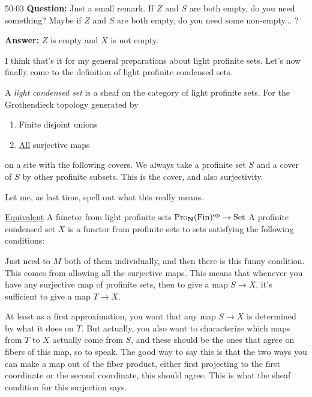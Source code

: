 \begin{unfinished}{50:03}
\textbf{Question:} Just a small remark. If $Z$ and $S$ are both empty, do you need something? Maybe if $Z$ and $S$ are both empty, do you need some non-empty... ? 

\textbf{Answer:} $Z$ is empty and $X$ is not empty. 

I think that's it for my general preparations about light profinite sets. Let's now finally come to the definition of light profinite condensed sets.

\begin{definition}

A \emph{light condensed set} is a sheaf on the category of light profinite sets. For the Grothendieck topology generated by 

\begin{enumerate}
\item Finite disjoint unions
\item \underline{All} surjective maps
\end{enumerate} 

\end{definition}

on a site with the following covers. We always take a profinite set $S$ and a cover of $S$ by other profinite subsets. This is the cover, and also surjectivity.

Let me, as last time, spell out what this really means.

\underline{Equivalent} A functor from light profinite sets $\operatorname{Pro}_{\mathbf N}(\operatorname{Fin})^{\mathrm{op}} \to \mathrm{Set}$
A profinite condensed set $X$ is a functor from profinite sets to sets satisfying the following conditions:

Just need to $M$ both of them individually, and then there is this funny condition. This comes from allowing all the surjective maps. This means that whenever you have any surjective map of profinite sets, then to give a map $S \to X$, it's sufficient to give a map $T \to X$. 

At least as a first approximation, you want that any map $S \to X$ is determined by what it does on $T$. But actually, you also want to characterize which maps from $T$ to $X$ actually come from $S$, and these should be the ones that agree on fibers of this map, so to speak. The good way to say this is that the two ways you can make a map out of the fiber product, either first projecting to the first coordinate or the second coordinate, this should agree. This is what the sheaf condition for this surjection says.


\end{unfinished}
